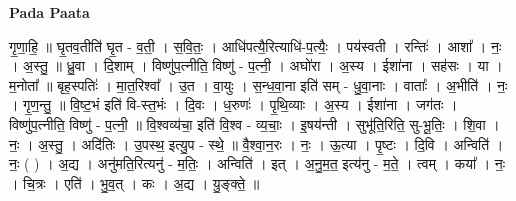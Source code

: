 \documentclass[17pt]{extarticle}
\begin{document}
\textbf{Pada Paata} \newline

गृ॒णा॒हि॒ ॥ घृ॒तव॒तीति॑ घृ॒त - व॒ती॒ । स॒वि॒तः॒ । आधि॑पत्यै॒रित्याधि॑-प॒त्यैः॒ । पय॑स्वती । रन्तिः॑ । आशा᳚ । नः॒ । अ॒स्तु॒ ॥ ध्रु॒वा । दि॒शाम् । विष्णु॑प॒त्नीति॒ विष्णु॑ - प॒त्नी॒ । अघो॑रा । अ॒स्य । ईशा॑ना । सह॑सः । या । म॒नोता᳚ ॥ बृह॒स्पतिः॑ । मा॒त॒रिश्वा᳚ । उ॒त । वा॒युः । स॒न्ध॒वा॒ना इति॑ सम् - धु॒वा॒नाः । वाताः᳚ । अ॒भीति॑ । नः॒ । गृ॒ण॒न्तु॒ ॥ वि॒ष्ट॒भं इति॑ वि-स्त॒भंः । दि॒वः । ध॒रुणः॑ । पृ॒थि॒व्याः । अ॒स्य । ईशा॑ना । जग॑तः । विष्णु॑प॒त्नीति॒ विष्णु॑ - प॒त्नी॒ ॥ वि॒श्वव्य॑चा॒ इति॑ वि॒श्व - व्य॒चाः॒ । इ॒षय॑न्ती । सुभू॑ति॒रिति॒ सु-भू॒तिः॒ । शि॒वा । नः॒ । अ॒स्तु॒ । अदि॑तिः । उ॒पस्थ॒ इत्यु॒प - स्थे॒ ॥ वै॒श्वा॒न॒रः । नः॒ । ऊ॒त्या । पृ॒ष्टः । दि॒वि । अन्विति॑ । नः॒ ( ) । अ॒द्य । अनु॑मति॒रित्यनु॑ - म॒तिः॒ । अन्विति॑ । इत् । अ॒नु॒म॒त॒ इत्य॑नु - म॒ते॒ । त्वम् । कया᳚ । नः॒ । चि॒त्रः । एति॑ । भु॒व॒त् । कः । अ॒द्य । यु॒ङ्क्ते॒ ॥  \newline
\end{document}
